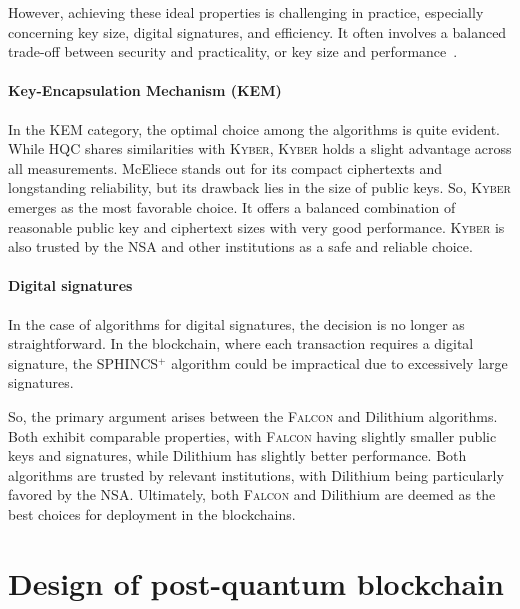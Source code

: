 However, achieving these ideal properties is challenging in practice, especially concerning key size, digital signatures, and efficiency. It often involves a balanced trade-off between security and practicality, or key size and performance~\cite{pq.blockchain.survey.10288193}.

\subsubsection{Key-Encapsulation Mechanism (KEM)}

In the KEM category, the optimal choice among the algorithms is quite evident. While HQC shares similarities with \textsc{Kyber}, \textsc{Kyber} holds a slight advantage across all measurements. McEliece stands out for its compact ciphertexts and longstanding reliability, but its drawback lies in the size of public keys. So, \textsc{Kyber} emerges as the most favorable choice. It offers a balanced combination of reasonable public key and ciphertext sizes with very good performance. \textsc{Kyber} is also trusted by the NSA and other institutions as a safe and reliable choice.

\subsubsection{Digital signatures}

In the case of algorithms for digital signatures, the decision is no longer as straightforward. In the blockchain, where each transaction requires a digital signature, the SPHINCS$^+$ algorithm could be impractical due to excessively large signatures. 

So, the primary argument arises between the \textsc{Falcon} and Dilithium algorithms. Both exhibit comparable properties, with \textsc{Falcon} having slightly smaller public keys and signatures, while Dilithium has slightly better performance. Both algorithms are trusted by relevant institutions, with Dilithium being particularly favored by the NSA. Ultimately, both \textsc{Falcon} and Dilithium are deemed as the best choices for deployment in the blockchains.



\chapter{Design of post-quantum blockchain}
\label{chap:PQBDesign}

